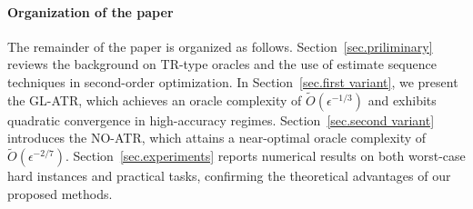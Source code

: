 \paragraph{Organization of the paper}
The remainder of the paper is organized as follows. Section~\ref{sec.priliminary} reviews the background on TR-type oracles and the use of estimate sequence techniques in second-order optimization. In Section~\ref{sec.first variant}, we present the GL-ATR, which achieves an oracle complexity of $\tilde O(\epsilon^{-1/3})$ and exhibits quadratic convergence in high-accuracy regimes. Section~\ref{sec.second variant} introduces the NO-ATR, which attains a near-optimal oracle complexity of $\tilde O(\epsilon^{-2/7})$. Section~\ref{sec.experiments} reports numerical results on both worst-case hard instances and practical tasks, confirming the theoretical advantages of our proposed methods.